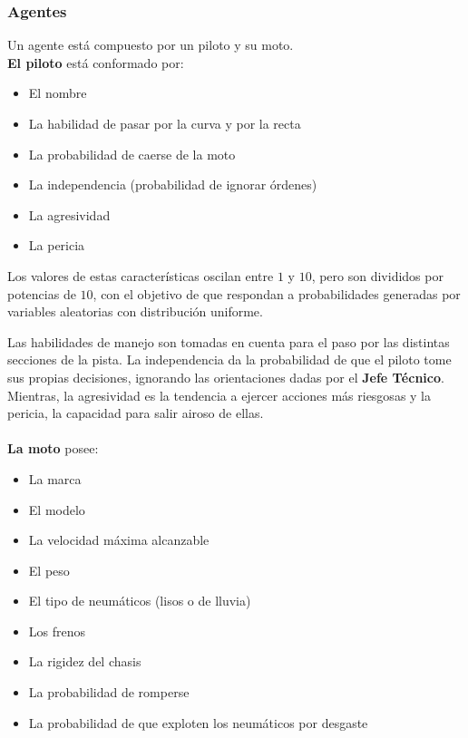 \documentclass[12pt, letterpaper,spanish]{article}
\theoremstyle{definition}
\theoremstyle{remark}
\begin{document}
		\subsubsection{Agentes}
		Un agente está compuesto por un piloto y su moto. \\

		\textbf{El piloto} está conformado por:
		\begin{itemize}
    		\item El nombre
    		\item La habilidad de pasar por la curva y por la recta
    		\item La probabilidad de caerse de la moto
    		\item La independencia (probabilidad de ignorar órdenes)
    		\item La agresividad
    		\item La pericia
		\end{itemize}

		Los valores de estas características oscilan entre $1$ y $10$, pero son divididos por potencias de $10$, con el objetivo de que respondan a probabilidades generadas por variables aleatorias con distribución uniforme. 
		
		Las habilidades de manejo son tomadas en cuenta para el paso por las distintas secciones de la pista. La independencia da la probabilidad de que el piloto tome sus propias decisiones, ignorando las orientaciones dadas por el \textbf{Jefe Técnico}. Mientras, la agresividad es la tendencia a ejercer acciones más riesgosas y la pericia, la capacidad para salir airoso de ellas. \\ \\

		\textbf{La moto} posee:
		\begin{itemize}
    		\item La marca
    		\item El modelo
    		\item La velocidad máxima alcanzable
    		\item El peso
    		\item El tipo de neumáticos (lisos o de lluvia)
    		\item Los frenos
    		\item La rigidez del chasis
    		\item La probabilidad de romperse
    		\item La probabilidad de que exploten los neumáticos por desgaste
		\end{itemize}
\end{document}
